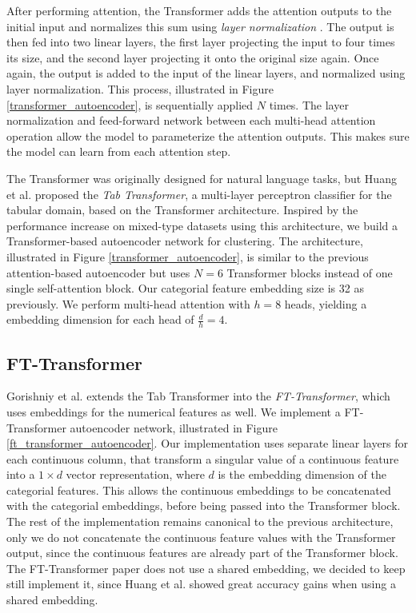 After performing attention, the Transformer adds the attention outputs to the initial input and normalizes this sum using \textit{layer normalization} \cite{layer_normalization}. The output is then fed into two linear layers, the first layer projecting the input to four times its size, and the second layer projecting it onto the original size again. Once again, the output is added to the input of the linear layers, and normalized using layer normalization. This process, illustrated in Figure \ref{transformer_autoencoder}, is sequentially applied $N$ times. The layer normalization and feed-forward network between each multi-head attention operation allow the model to parameterize the attention outputs. This makes sure the model can learn from each attention step.

The Transformer was originally designed for natural language tasks, but Huang et al. \cite{tab_transformer} proposed the \textit{Tab Transformer}, a multi-layer perceptron classifier for the tabular domain, based on the Transformer architecture. Inspired by the performance increase on mixed-type datasets using this architecture, we build a Transformer-based autoencoder network for clustering. The architecture, illustrated in Figure \ref{transformer_autoencoder}, is similar to the previous attention-based autoencoder but uses $N = 6$ Transformer blocks instead of one single self-attention block. Our categorial feature embedding size is 32 as previously. We perform multi-head attention with $h = 8$ heads, yielding a embedding dimension for each head of $\frac{d}{h} = 4$.

\subsection{FT-Transformer}

Gorishniy et al. extends the Tab Transformer into the \textit{FT-Transformer}, which uses embeddings for the numerical features as well. We implement a FT-Transformer autoencoder network, illustrated in Figure \ref{ft_transformer_autoencoder}. Our implementation uses separate linear layers for each continuous column, that transform a singular value of a continuous feature into a $1 \times d$ vector representation, where $d$ is the embedding dimension of the categorial features. This allows the continuous embeddings to be concatenated with the categorial embeddings, before being passed into the Transformer block. The rest of the implementation remains canonical to the previous architecture, only we do not concatenate the continuous feature values with the Transformer output, since the continuous features are already part of the Transformer block. The FT-Transformer paper does not use a shared embedding, we decided to keep still implement it, since Huang et al. \cite{tab_transformer} showed great accuracy gains when using a shared embedding.

